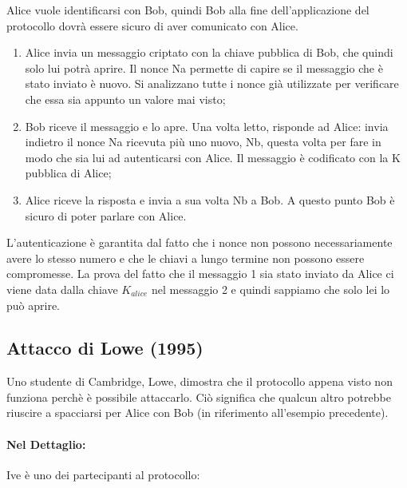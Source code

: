 Alice vuole identificarsi con Bob, quindi Bob alla fine dell’applicazione del protocollo dovrà essere
sicuro di aver comunicato con Alice.
\begin{enumerate}
    \item Alice invia un messaggio criptato con la
          chiave pubblica di Bob, che quindi solo lui potrà
          aprire. Il nonce Na permette di capire se il
          messaggio che è stato inviato è nuovo. Si
          analizzano tutte i nonce già utilizzate per 
          verificare che essa sia appunto un valore mai
          visto;
    \item Bob riceve il messaggio e lo apre. Una volta
          letto, risponde ad Alice: invia indietro il nonce
          Na ricevuta più uno nuovo, Nb, questa volta 
          per fare in modo che sia lui ad autenticarsi con
          Alice. Il messaggio è codificato con la K 
          pubblica di Alice;
    \item Alice riceve la risposta e invia a sua volta
          Nb a Bob. A questo punto Bob è sicuro di poter
          parlare con Alice.
\end{enumerate}

L’autenticazione è garantita dal fatto che i nonce non 
possono necessariamente avere lo stesso
numero e che le chiavi a lungo termine non possono 
essere compromesse.
La prova del fatto che il messaggio 1 sia stato inviato 
da Alice ci viene data dalla chiave \(K_{alice}\) nel
messaggio 2 e quindi sappiamo che solo lei lo può aprire.

\subsection{Attacco di Lowe (1995)}

Uno studente di Cambridge, Lowe, dimostra che il protocollo appena visto non funziona perchè è
possibile attaccarlo. Ciò significa che qualcun altro potrebbe riuscire a spacciarsi per Alice con Bob
(in riferimento all’esempio precedente).

\paragraph{Nel Dettaglio: }
Ive è uno dei partecipanti al protocollo:


